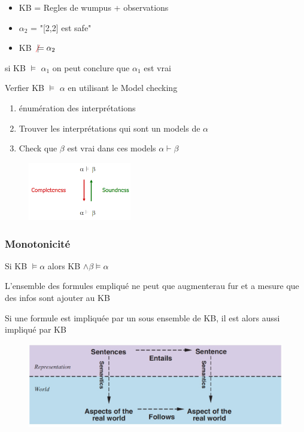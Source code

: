 		\begin{itemize}
			\item KB = Regles de wumpus + observations
			\item $\alpha_2$ = "[2,2] est safe"
			\item KB $\textcolor{red}{\not} \models \alpha_2$
		\end{itemize}
		
		
		si KB $\models$ $\alpha_1$ on peut conclure que $\alpha_1$ est vrai
		
		Verfier KB $\models$ $\alpha$ en utilisant le Model checking
		
		\begin{enumerate}
			\item énumération des interprétations
			\item Trouver les interprétations qui sont un models de $\alpha$
			\item Check que $\beta$ est vrai dans ces models $\alpha \vdash \beta$
		\end{enumerate}
		
		\begin{figure}[htp]	
			\centering
			\includegraphics[width=0.4\textwidth]{img/KBA2.png}
		\end{figure}
		
		\subsubsection{Monotonicité}
			Si KB $\models \alpha$ alors KB $\land \beta \models \alpha$
			
			L'ensemble des formules empliqué ne peut que augmenterau fur et a mesure que des infos sont ajouter au KB
			
			Si une formule est impliquée par un sous ensemble de KB, il est alors aussi impliqué par KB
			
			\begin{figure}[htp]	
			\centering
			\includegraphics[width=\textwidth]{img/process.png}
		\end{figure}
		
